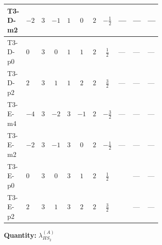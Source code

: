 \documentclass[8pt]{article}
\begin{document}
\begin{landscape}
\begin{longtable}{@{}llcccccc >{\raggedright\arraybackslash}p{0.21\linewidth} >{\raggedright\arraybackslash}p{0.21\linewidth} >{\raggedright\arraybackslash}p{0.21\linewidth}@{}}
\midrule
T3-D-m2 & $-2$ & $3$ & $-1$ & $1$ & $0$ & $2$ & $-\frac{1}{2}$ & --- & --- & --- \\
\midrule
T3-D-p0 & $0$ & $3$ & $0$ & $1$ & $1$ & $2$ & $\frac{1}{2}$ & --- & --- & --- \\
\midrule
T3-D-p2 & $2$ & $3$ & $1$ & $1$ & $2$ & $2$ & $\frac{3}{2}$ & --- & --- & --- \\
\midrule
T3-E-m4 & $-4$ & $3$ & $-2$ & $3$ & $-1$ & $2$ & $-\frac{3}{2}$ & --- & --- & --- \\
\midrule
T3-E-m2 & $-2$ & $3$ & $-1$ & $3$ & $0$ & $2$ & $-\frac{1}{2}$ & --- & --- & --- \\
\midrule
T3-E-p0 & $0$ & $3$ & $0$ & $3$ & $1$ & $2$ & $\frac{1}{2}$ & \scriptsize\adjustbox{max width=\linewidth}{$\begin{gathered} +{g_1}^2 \left(4 {g_2}^2-\frac{15 {\lambda_{HS_2}^{(A)}}}{2}\right)\end{gathered}$} & --- & --- \\
\midrule
T3-E-p2 & $2$ & $3$ & $1$ & $3$ & $2$ & $2$ & $\frac{3}{2}$ & \scriptsize\adjustbox{max width=\linewidth}{$\begin{gathered} +{g_1}^2 \left(8 {g_2}^2-\frac{51 {\lambda_{HS_2}^{(A)}}}{2}\right)\end{gathered}$} & --- & --- \\
\midrule
\bottomrule
\end{longtable}
\clearpage
\noindent\textbf{Quantity: }$\lambda_{HS_2}^{(A)}$\par\smallskip

\end{landscape}
\end{document}
